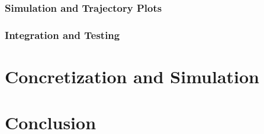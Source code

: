 \documentclass[11pt,a4paper]{article}
\begin{document}
\subsubsection{Simulation and Trajectory Plots}

\subsubsection{Integration and Testing}

\section{Concretization and Simulation}
\label{sec:concretization}


\section{Conclusion}


\end{document}
